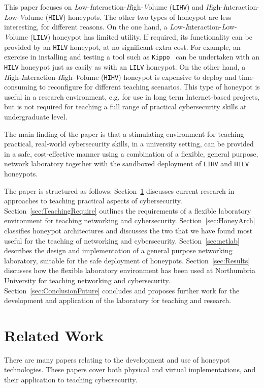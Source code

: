 \documentclass{ieeeaccess}
\begin{document}
This paper focuses on \emph{L}ow-\emph{I}nteraction-\emph{H}igh-\emph{V}olume
(\texttt{LIHV}) and \emph{H}igh-\emph{I}nteraction-\emph{L}ow-\emph{V}olume
(\texttt{HILV}) honeypots.  The other two types of honeypot are less
interesting, for different reasons. On the one hand, a
\emph{L}ow-\emph{I}nteraction-\emph{L}ow-\emph{V}olume (\texttt{LILV}) honeypot
has limited utility. If required, its functionality can be provided by an
\texttt{HILV} honeypot, at no significant extra cost. For example, an exercise
in installing and testing a tool such as \texttt{Kippo}~\cite{SH:15} can be
undertaken with an \texttt{HILV} honeypot just as easily as with an
\texttt{LILV} honeypot.  On the other hand, a
\emph{H}igh-\emph{I}nteraction-\emph{H}igh-\emph{V}olume (\texttt{HIHV})
honeypot is expensive to deploy and time-consuming to reconfigure for different
teaching scenarios. This type of honeypot is useful in a research environment,
e.g. for use in long term Internet-based projects, but is not required for
teaching a full range of practical cybersecurity skills at undergraduate level.

The main finding of the paper is that a stimulating environment for teaching
practical, real-world cybersecurity skills, in a university setting, can be
provided in a safe, cost-effective manner using a combination of a flexible,
general purpose, network laboratory together with the sandboxed deployment of
\texttt{LIHV} and \texttt{HILV} honeypots.

The paper is structured as follows: Section~\ref{sec:RelatedWork} discusses
current research in approaches to teaching practical aspects of cybersecurity.
Section~\ref{sec:TeachingRequire} outlines the requirements of a flexible
laboratory environment for teaching networking and cybersecurity.
Section~\ref{sec:HoneyArch} classifies honeypot architectures and discusses the
two that we have found most useful for the teaching of networking and
cybersecurity.  Section~\ref{sec:netlab} describes the design and
implementation of a general purpose networking laboratory, suitable
for the safe deployment of honeypots.  Section~\ref{sec:Results} discusses how
the flexible laboratory environment has been used at Northumbria University for
teaching networking and cybersecurity.  Section~\ref{sec:ConclusionFuture}
concludes and proposes further work for the development and application of the
laboratory for teaching and research.

\section{Related Work}\label{sec:RelatedWork}
There are many papers relating to the development and use of honeypot
technologies. These papers cover both physical and virtual implementations, and
their application to teaching cybersecurity. 
\end{document}
